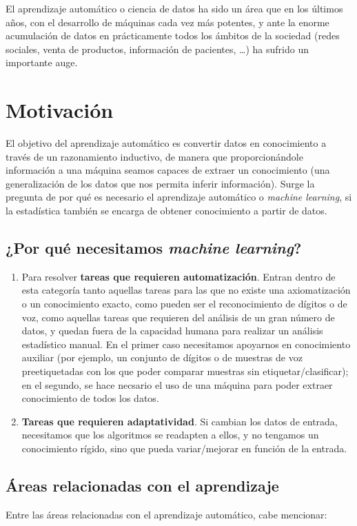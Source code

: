 El aprendizaje automático o ciencia de datos ha sido un área que en los últimos años, con el desarrollo de máquinas cada vez
más potentes, y ante la enorme acumulación de datos en prácticamente todos los ámbitos de la sociedad (redes sociales, venta de
productos, información de pacientes, \ldots) ha sufrido un importante auge.

\section{Motivación}
El objetivo del aprendizaje automático es convertir datos en conocimiento a través de un razonamiento inductivo, de manera que
proporcionándole información a una máquina seamos capaces de extraer un conocimiento (una generalización de los datos que nos permita
inferir información). Surge la pregunta de por qué es necesario el aprendizaje automático o \textit{machine learning}, si la
estadística también se encarga de obtener conocimiento a partir de datos.

\subsection{¿Por qué necesitamos \textit{machine learning}?}
\begin{enumerate}[i]
\item Para resolver \textbf{tareas que requieren automatización}. Entran dentro de esta categoría tanto aquellas tareas para
las que no existe una axiomatización o un conocimiento exacto, como pueden ser el reconocimiento de dígitos o de voz, como 
aquellas tareas que requieren del análisis de un gran número de datos, y quedan fuera de la capacidad humana para realizar
un análisis estadístico manual. En el primer caso necesitamos apoyarnos en conocimiento auxiliar (por ejemplo, 
un conjunto de dígitos o de muestras de voz preetiquetadas con los que poder comparar muestras sin etiquetar/clasificar); 
en el segundo, se hace necsario el uso de una máquina para poder extraer conocimiento de todos los datos.

\item \textbf{Tareas que requieren adaptatividad}. Si cambian los datos de entrada, necesitamos que los algoritmos se readapten
a ellos, y no tengamos un conocimiento rígido, sino que pueda variar/mejorar en función de la entrada.
\end{enumerate}

\subsection{Áreas relacionadas con el aprendizaje}
Entre las áreas relacionadas con el aprendizaje automático, cabe mencionar:

